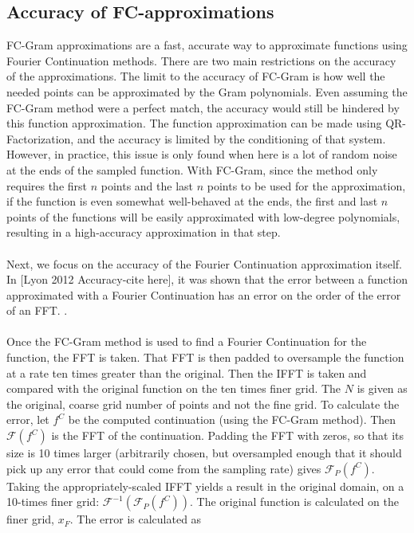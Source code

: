 \documentclass[11pt]{amsart}
\begin{document}
\subsection{Accuracy of FC-approximations} FC-Gram approximations are a fast, accurate way to approximate functions using Fourier Continuation methods.  There are two main restrictions on the accuracy of the approximations. The limit to the accuracy of FC-Gram is how well the needed points can be approximated by the Gram polynomials. Even assuming the FC-Gram method were a perfect match, the accuracy would still be hindered by this function approximation. The function approximation can be made using QR-Factorization, and the accuracy is limited by the conditioning of that system.  However, in practice, this issue is only found when here is a lot of random noise at the ends of the sampled function.  With FC-Gram, since the method only requires the first $n$ points and the last $n$ points to be used for the approximation, if the function is even somewhat well-behaved at the ends, the first and last $n$ points of the functions will be easily approximated with low-degree polynomials, resulting in a high-accuracy approximation in that step.   \\ \\
Next, we focus on the accuracy of the Fourier Continuation approximation itself.  In [Lyon 2012 Accuracy-cite here], it was shown that the error between a function approximated with a Fourier Continuation has an error on the order of the error of an FFT. . \\ \\
 Once the FC-Gram method is used to find a Fourier Continuation for the function, the FFT is taken.  That FFT is then padded to oversample the function at a rate ten times greater than the original.  Then the IFFT is taken and compared with the original function on the ten times finer grid.  The $N$ is given as the original, coarse grid number of points and not the fine grid. To calculate the error, let $f^C$ be the computed continuation (using the FC-Gram method). Then $\mathscr{F}(f^C)$ is the FFT of the continuation.  Padding the FFT with zeros, so that its size is 10 times larger (arbitrarily chosen, but oversampled enough that it should pick up any error that could come from the sampling rate) gives $\mathscr{F}_P(f^C)$.  Taking the appropriately-scaled IFFT yields a result in the original domain, on a 10-times finer grid: $\mathscr{F}^{-1}(\mathscr{F}_P(f^C))$.  The original function is calculated on the finer grid, $x_F$.  The error is calculated as
\end{document}
